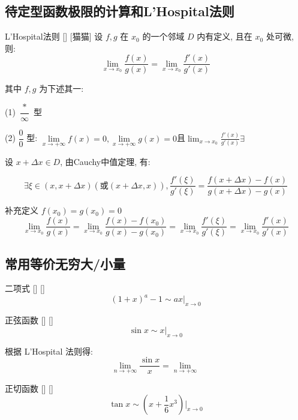 \documentclass[UTF8]{ctexart}
\begin{document}
		\subsection{待定型函数极限的计算和L'Hospital法则}
		
			\begin{thm}
			    []
			    {L'Hospital法则}
			    []
			    [猫猫]
				设 \(f,g\) 在 \(x_0\) 的一个邻域 \(D\) 内有定义, 且在 \(x_0\) 处可微, 则: 
				\[\lim_{x\to x_0}\frac{f(x)}{g(x)}=\lim_{x\to x_0}\frac{f'(x)}{g'(x)}\]

				其中 \(f,g\) 为下述其一:
				
				(1) \(\dfrac{*}{\infty}\) 型

				(2) \(\dfrac{0}{0}\) 型: 
				\(\lim\limits_{x\to+\infty}f(x)=0,\lim\limits_{x\to+\infty}g(x)=0\)且\(\lim_{x\to x_0}\frac{f'(x)}{g'(x)}\exists\)
			\end{thm}

			\begin{prf}
				设 \(x+\Delta x\in D\), 由Cauchy中值定理, 有: 

				\[\exists\xi\in(x,x+\Delta x)(\text{或}(x+\Delta x,x)),\frac{f'(\xi)}{g'(\xi)}=\frac{f(x+\Delta x)-f(x)}{g(x+\Delta x)-g(x)}\]

				补充定义 \(f(x_0)=g(x_0)=0\)
				\[\lim_{x\to x_0}\frac{f(x)}{g(x)}=\lim_{x\to x_0}\frac{f(x)-f(x_0)}{g(x)-g(x_0)}=\lim_{x\to x_0}\frac{f'(\xi)}{g'(\xi)}=\lim_{x\to x_0}\frac{f'(x)}{g'(x)}\]
			\end{prf}

		\subsection{常用等价无穷大/小量}
		
			\begin{xmp}
			    []
			    {二项式}
			    []
			    []
				\[(1+x)^a-1\sim ax|_{x\to 0}\]
			\end{xmp}

			\begin{xmp}
			    []
			    {正弦函数}
			    []
			    []
				\[\sin x\sim x|_{x\to 0}\]
			\end{xmp}

			\begin{prf}
				根据 L'Hospital 法则得: 
				\[\lim_{n\to+\infty}\frac{\sin x}{x}=\lim_{n\to+\infty}\frac{}{}\]
			\end{prf}

			\begin{xmp}
			    []
			    {正切函数}
			    []
			    []
				\[\tan x\sim \left(x+\frac{1}{6}x^3\right)|_{x\to 0}\]
			\end{xmp}
			
\end{document}
